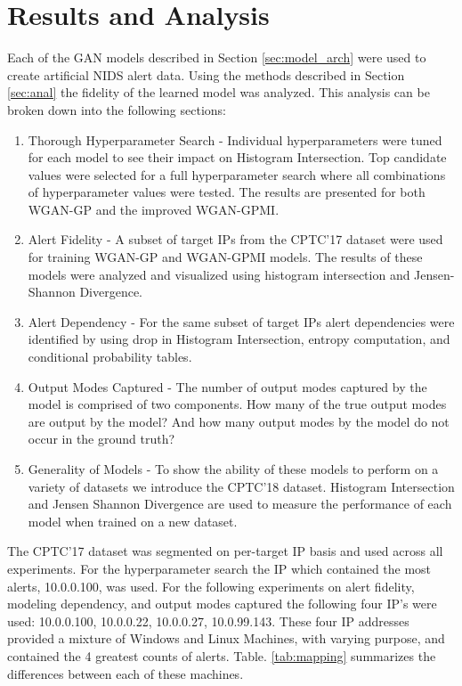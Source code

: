 \chapter{Results and Analysis}
\label{sec:rna}

Each of the GAN models described in Section \ref{sec:model_arch} were used to create artificial NIDS alert data.  Using the methods described in Section \ref{sec:anal} the fidelity of the learned model was analyzed. This analysis can be broken down into the following sections:

\begin{enumerate}
	\item Thorough Hyperparameter Search - Individual hyperparameters were tuned for each model to see their impact on Histogram Intersection. Top candidate values were selected for a full hyperparameter search where all combinations of hyperparameter values were tested. The results are presented for both WGAN-GP and the improved WGAN-GPMI.

	\item Alert Fidelity - A subset of target IPs from the CPTC'17 dataset were used for training WGAN-GP and WGAN-GPMI models. The results of these models were analyzed and visualized using histogram intersection and Jensen-Shannon Divergence.

	\item Alert Dependency - For the same subset of target IPs alert dependencies were identified by using drop in Histogram Intersection, entropy computation, and conditional probability tables.

	\item Output Modes Captured - The number of output modes captured by the model is comprised of two components. How many of the true output modes are output by the model? And how many output modes by the model do not occur in the ground truth?

	\item Generality of Models - To show the ability of these models to perform on a variety of datasets we introduce the CPTC'18 dataset. Histogram Intersection and Jensen Shannon Divergence are used to measure the performance of each model when trained on a new dataset.

\end{enumerate}

The CPTC'17 dataset was segmented on per-target IP basis and used across all experiments. For the hyperparameter search the IP which contained the most alerts, 10.0.0.100, was used. For the following experiments on alert fidelity, modeling dependency, and output modes captured the following four IP's were used: 10.0.0.100, 10.0.0.22, 10.0.0.27, 10.0.99.143. These four IP addresses provided a mixture of Windows and Linux Machines, with varying purpose, and contained the 4 greatest counts of alerts. Table. \ref{tab:mapping} summarizes the differences between each of these machines.

